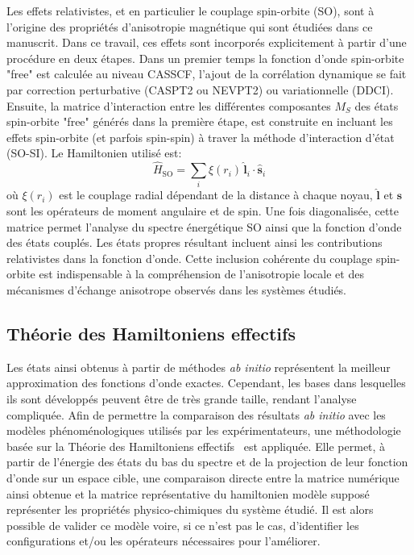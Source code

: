 \documentclass[12pt,a4paper]{report}
\numberwithin{equation}{section}
\begin{document}
Les effets relativistes, et en particulier le couplage spin-orbite (SO), sont à l'origine des propriétés d'anisotropie magnétique qui sont étudiées dans ce manuscrit.  
Dans ce travail, ces effets sont incorporés explicitement à partir d'une procédure en deux étapes. 
Dans un premier temps la fonction d'onde spin-orbite "free" est calculée au niveau CASSCF, l'ajout de la corrélation dynamique se fait par correction perturbative (CASPT2 ou NEVPT2) ou variationnelle (DDCI).
Ensuite, la matrice d'interaction entre les différentes composantes $M_S$ des états spin-orbite "free" générés dans la première étape, est construite en incluant les effets spin-orbite (et parfois spin-spin) à traver la méthode d'interaction d'état (SO-SI).
Le Hamiltonien utilisé est:
\begin{equation}
\hat{H}_{\mathrm{SO}} = \sum_i \xi(r_i)\, \hat{\mathbf{l}}_i \cdot \hat{\mathbf{s}}_i
\end{equation}
où \(\xi(r_i)\) est le couplage radial dépendant de la distance à chaque noyau, $\hat{\mathbf{l}}$ et $\hat{\mathbf{s}}$ sont les opérateurs de moment angulaire et de spin.
Une fois diagonalisée, cette matrice permet l'analyse du spectre énergétique SO ainsi que la fonction d'onde des états couplés.
Les états propres résultant incluent ainsi les contributions relativistes dans la fonction d’onde.  
Cette inclusion cohérente du couplage spin-orbite est indispensable à la compréhension de l'anisotropie locale et des mécanismes d’échange anisotrope observés dans les systèmes étudiés.


\subsection*{Théorie des Hamiltoniens effectifs}

Les états ainsi obtenus à partir de méthodes \textit{ab initio} représentent la meilleur approximation des fonctions d'onde exactes.
Cependant, les bases dans lesquelles ils sont développés peuvent être de très grande taille, rendant l'analyse compliquée.
Afin de permettre la comparaison des résultats \textit{ab initio} avec les modèles phénoménologiques utilisés par les expérimentateurs, une méthodologie basée sur la Théorie des Hamiltoniens effectifs~\cite{bloch_sur_1958} est appliquée.
Elle permet, à partir de l'énergie des états du bas du spectre et de la projection de leur fonction d'onde sur un espace cible, une comparaison directe entre la matrice numérique ainsi obtenue et la matrice représentative du hamiltonien modèle supposé représenter les propriétés physico-chimiques du système étudié.
Il est alors possible de valider ce modèle voire, si ce n'est pas le cas, d'identifier les configurations et/ou les opérateurs nécessaires pour l'améliorer.
\end{document}
